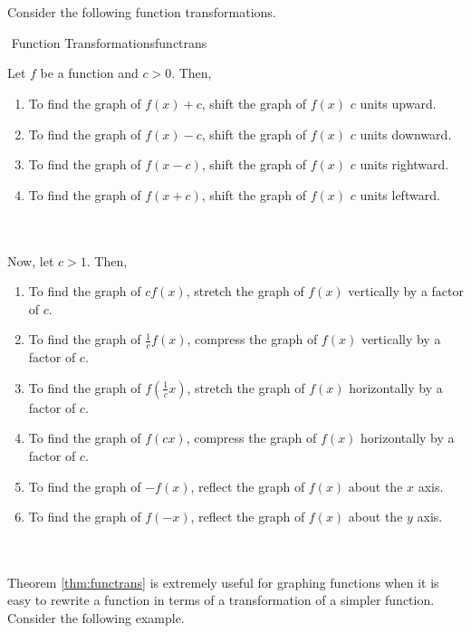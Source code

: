 		\pagebreak
		\vphantom
		\\
		\\
		Consider the following function transformations.
		\begin{theorem}{\Stop\,\,Function Transformations}{functrans}
			
			Let \(f\) be a function and \(c>0\). Then,
			\begin{enumerate}
				\item To find the graph of \(f(x)+c\), shift the graph of \(f(x)\) \(c\) units upward.
				\item To find the graph of \(f(x)-c\), shift the graph of \(f(x)\) \(c\) units downward.
				\item To find the graph of \(f(x-c)\), shift the graph of \(f(x)\) \(c\) units rightward.
				\item To find the graph of \(f(x+c)\), shift the graph of \(f(x)\) \(c\) units leftward.
			\end{enumerate}
			\vphantom
			\\
			\\
			Now, let \(c>1\). Then,
			\begin{enumerate}
				\item To find the graph of \(cf(x)\), stretch the graph of \(f(x)\) vertically by a factor of \(c\).
				\item To find the graph of \(\frac{1}{c}f(x)\), compress the graph of \(f(x)\) vertically by a factor of \(c\).
				\item To find the graph of \(f\left(\frac{1}{c}x\right)\), stretch the graph of \(f(x)\) horizontally by a factor of \(c\).
				\item To find the graph of \(f(cx)\), compress the graph of \(f(x)\) horizontally by a factor of \(c\).
				\item To find the graph of \(-f(x)\), reflect the graph of \(f(x)\) about the \(x\) axis.
				\item To find the graph of \(f(-x)\), reflect the graph of \(f(x)\) about the \(y\) axis.
			\end{enumerate}

		\end{theorem}
		\pagebreak
		\vphantom
		\\
		\\
		Theorem \ref{thm:functrans} is extremely useful for graphing functions when it is easy to rewrite a function in terms of a transformation of a simpler function. Consider the following example.
